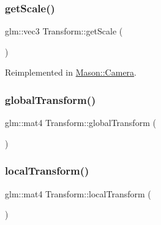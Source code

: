 \hypertarget{class_mason_1_1_transform_a24107560725b250c4c2e10ab98a6ac04}{}\label{class_mason_1_1_transform_a24107560725b250c4c2e10ab98a6ac04} 
\subsubsection{\texorpdfstring{get\+Scale()}{getScale()}}
{\footnotesize\ttfamily glm\+::vec3 Transform\+::get\+Scale (\begin{DoxyParamCaption}{ }\end{DoxyParamCaption})\hspace{0.3cm}{\ttfamily [virtual]}}



Reimplemented in \hyperlink{class_mason_1_1_camera_a405b26eaaae2ab7a460dfc319a9d16ea}{Mason\+::\+Camera}.

\hypertarget{class_mason_1_1_transform_a35e627aa09604bf3a81f4c07d28205f3}{}\label{class_mason_1_1_transform_a35e627aa09604bf3a81f4c07d28205f3} 
\subsubsection{\texorpdfstring{global\+Transform()}{globalTransform()}}
{\footnotesize\ttfamily glm\+::mat4 Transform\+::global\+Transform (\begin{DoxyParamCaption}{ }\end{DoxyParamCaption})}

\hypertarget{class_mason_1_1_transform_a8b85abc03488f58bef8bb78df77c1689}{}\label{class_mason_1_1_transform_a8b85abc03488f58bef8bb78df77c1689} 
\subsubsection{\texorpdfstring{local\+Transform()}{localTransform()}}
{\footnotesize\ttfamily glm\+::mat4 Transform\+::local\+Transform (\begin{DoxyParamCaption}{ }\end{DoxyParamCaption})}

\hypertarget{class_mason_1_1_transform_a6e1a6b57214a7de21595e6af8b05138b}{}\label{class_mason_1_1_transform_a6e1a6b57214a7de21595e6af8b05138b} 
